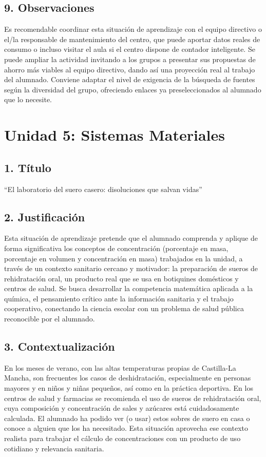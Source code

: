 \documentclass[11pt,a4paper]{article}
\begin{document}
\subsection*{9. Observaciones}
Es recomendable coordinar esta situación de aprendizaje con el equipo directivo o el/la responsable de mantenimiento del centro, que puede aportar datos reales de consumo o incluso visitar el aula si el centro dispone de contador inteligente. Se puede ampliar la actividad invitando a los grupos a presentar sus propuestas de ahorro más viables al equipo directivo, dando así una proyección real al trabajo del alumnado. Conviene adaptar el nivel de exigencia de la búsqueda de fuentes según la diversidad del grupo, ofreciendo enlaces ya preseleccionados al alumnado que lo necesite.

\newpage
\section{Unidad 5: Sistemas Materiales}
\subsection*{1. Título}
``El laboratorio del suero casero: disoluciones que salvan vidas''

\subsection*{2. Justificación}
Esta situación de aprendizaje pretende que el alumnado comprenda y aplique de forma significativa los conceptos de concentración (porcentaje en masa, porcentaje en volumen y concentración en masa) trabajados en la unidad, a través de un contexto sanitario cercano y motivador: la preparación de sueros de rehidratación oral, un producto real que se usa en botiquines domésticos y centros de salud. Se busca desarrollar la competencia matemática aplicada a la química, el pensamiento crítico ante la información sanitaria y el trabajo cooperativo, conectando la ciencia escolar con un problema de salud pública reconocible por el alumnado.

\subsection*{3. Contextualización}
En los meses de verano, con las altas temperaturas propias de Castilla-La Mancha, son frecuentes los casos de deshidratación, especialmente en personas mayores y en niños y niñas pequeños, así como en la práctica deportiva. En los centros de salud y farmacias se recomienda el uso de sueros de rehidratación oral, cuya composición y concentración de sales y azúcares está cuidadosamente calculada. El alumnado ha podido ver (o usar) estos sobres de suero en casa o conoce a alguien que los ha necesitado. Esta situación aprovecha ese contexto realista para trabajar el cálculo de concentraciones con un producto de uso cotidiano y relevancia sanitaria.
\end{document}
